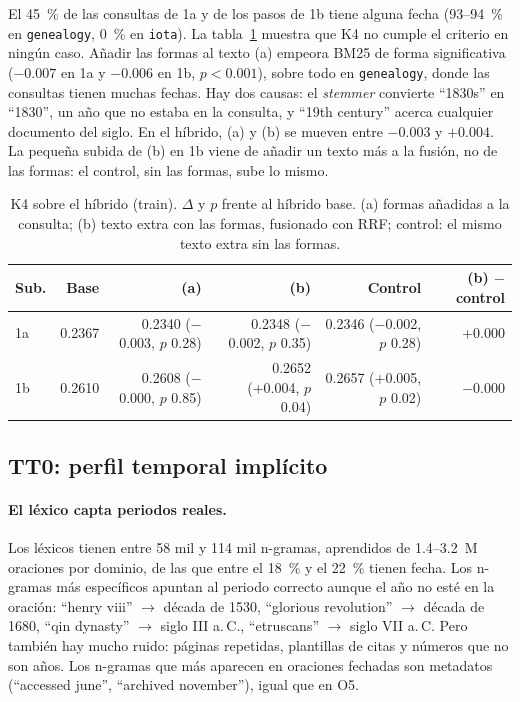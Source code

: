 \documentclass[11pt,a4paper]{article}
\begin{document}
El 45~\% de las consultas de 1a y de los pasos de 1b tiene alguna fecha (93--94~\% en \texttt{genealogy}, 0~\% en \texttt{iota}). La tabla~\ref{tab:k4} muestra que K4 no cumple el criterio en ningún caso. Añadir las formas al texto (a) empeora BM25 de forma significativa ($-0.007$ en 1a y $-0.006$ en 1b, $p < 0.001$), sobre todo en \texttt{genealogy}, donde las consultas tienen muchas fechas. Hay dos causas: el \emph{stemmer} convierte ``1830s'' en ``1830'', un año que no estaba en la consulta, y ``19th century'' acerca cualquier documento del siglo. En el híbrido, (a) y (b) se mueven entre $-0.003$ y $+0.004$. La pequeña subida de (b) en 1b viene de añadir un texto más a la fusión, no de las formas: el control, sin las formas, sube lo mismo.

\begin{table}[t]
\centering
\caption{K4 sobre el híbrido (train). $\Delta$ y $p$ frente al híbrido base. (a) formas añadidas a la consulta; (b) texto extra con las formas, fusionado con RRF; control: el mismo texto extra sin las formas.}
\label{tab:k4}
\footnotesize
\setlength{\tabcolsep}{4pt}
\begin{tabular}{lrrrrr}
\toprule
Sub. & Base & (a) & (b) & Control & (b) $-$ control \\
\midrule
1a & 0.2367 & 0.2340 ($-$0.003, $p$ 0.28) & 0.2348 ($-$0.002, $p$ 0.35) & 0.2346 ($-$0.002, $p$ 0.28) & +0.000 \\
1b & 0.2610 & 0.2608 ($-$0.000, $p$ 0.85) & 0.2652 (+0.004, $p$ 0.04) & 0.2657 (+0.005, $p$ 0.02) & $-$0.000 \\
\bottomrule
\end{tabular}
\end{table}

\subsection{TT0: perfil temporal implícito}
\label{sec:res-tt0}

\paragraph{El léxico capta periodos reales.} Los léxicos tienen entre 58 mil y 114 mil n-gramas, aprendidos de 1.4--3.2~M oraciones por dominio, de las que entre el 18~\% y el 22~\% tienen fecha. Los n-gramas más específicos apuntan al periodo correcto aunque el año no esté en la oración: ``henry viii'' $\rightarrow$ década de 1530, ``glorious revolution'' $\rightarrow$ década de 1680, ``qin dynasty'' $\rightarrow$ siglo III a.\,C., ``etruscans'' $\rightarrow$ siglo VII a.\,C. Pero también hay mucho ruido: páginas repetidas, plantillas de citas y números que no son años. Los n-gramas que más aparecen en oraciones fechadas son metadatos (``accessed june'', ``archived november''), igual que en O5.
\end{document}
